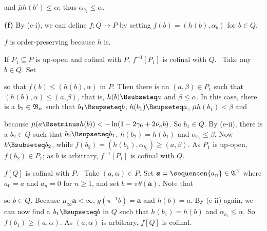{

\noindent and $\bar\mu h(b')\le\alpha$;  thus $\alpha_{b_2}\le\alpha$.\
\Qed

\medskip

{\bf (f)} By (e-i), we can define $f:Q\to P$ by setting
$f(b)=(h(b),\alpha_b)$ for $b\in Q$.

\medskip

 $f$ is order-preserving because $h$ is.

\medskip

 If $P_1\subseteq P$ is up-open and cofinal with $P$,
$f^{-1}[P_1]$ is cofinal with $Q$.   \Prf\ Take any $b\in Q$.   Set

\Centerline{$\alpha
=\min(\alpha_b,\bar\mu h(b)-\ln(1-2\gamma_0+2\bar\nu_{\kappa}b))
>\bar\mu h(b)$,}

\noindent so that $f(b)\le(h(b),\alpha)$ in $P$.   Then
there is an $(a,\beta)\in P_1$ such that $(h(b),\alpha)\le(a,\beta)$,
that is, $h(b)\Bsubseteq a$ and $\beta\le\alpha$.   In this case, there
is a $b_1\in\frak B_{\kappa}$ such that
$b_1\Bsupseteq b$, $h(b_1)\Bsupseteq a$, $\bar\mu h(b_1)<\beta$ and


\noindent because $\bar\mu(a\Bsetminus h(b))
<-\ln(1-2\gamma_0+2\bar\nu_{\kappa}b)$.   So
$b_1\in Q$.   By (e-ii), there is a $b_2\in Q$ such that
$b_2\Bsupseteq b_1$, $h(b_2)=h(b_1)$ and $\alpha_{b_2}\le\beta$.
Now $b\Bsubseteq b_2$, while $f(b_2)=(h(b_1),\alpha_{b_2})\ge(a,\beta)$.
As $P_1$ is up-open, $f(b_2)\in P_1$;  as $b$ is
arbitrary, $f^{-1}[P_1]$ is cofinal with $Q$.\ \Qed

\medskip

 $f[Q]$ is cofinal with $P$.
\Prf\ Take $(a,\alpha)\in P$.
Set $\pmb{a}=\sequencen{a_n}\in\frak A^{\Bbb N}$ where $a_0=a$ and
$a_n=0$ for $n\ge 1$, and set $b=\pi\theta(\pmb{a})$.   Note that


\noindent so $b\in Q$.   Because
$\bar\mu_{\infty}\pmb{a}<\infty$, $g(\pi^{-1}b)=\pmb{a}$ and $h(b)=a$.
By (e-ii) again, we can now find a
$b_1\Bsupseteq b$ in $Q$ such that $h(b_1)=h(b)$ and
$\alpha_{b_1}\le\alpha$.   So $f(b_1)\ge(a,\alpha)$.   As $(a,\alpha)$
is arbitrary, $f[Q]$ is cofinal.\ \Qed

}
